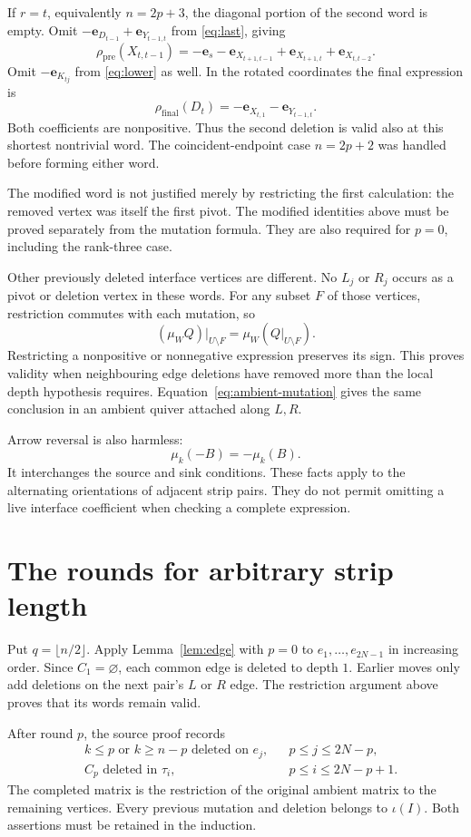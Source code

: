 \documentclass[11pt,a4paper]{article}
\newcommand{\e}{\mathbf e}
\begin{document}
If $r=t$, equivalently $n=2p+3$, the diagonal portion of the second word
is empty. Omit $-\e_{D_{t-1}}+\e_{Y_{t-1,t}}$ from \eqref{eq:last}, giving
\[
 \rho_{\mathrm{pre}}(X_{t,t-1})
 =-\e_s-\e_{X_{t+1,t-1}}+\e_{X_{t+1,t}}+\e_{X_{t,t-2}}.
\]
Omit $-\e_{K_{tj}}$ from \eqref{eq:lower} as well. In the rotated
coordinates the final expression is
\begin{equation}\label{eq:second-final}
 \rho_{\mathrm{final}}(D_t)=-\e_{X_{t,1}}-\e_{Y_{t-1,t}}.
\end{equation}
Both coefficients are nonpositive. Thus the second deletion is valid
also at this shortest nontrivial word. The coincident-endpoint case
$n=2p+2$ was handled before forming either word.

The modified word is not justified merely by restricting the first
calculation: the removed vertex was itself the first pivot. The modified
identities above must be proved separately from the mutation formula.
They are also required for $p=0$, including the rank-three case.

Other previously deleted interface vertices are different. No $L_j$ or
$R_j$ occurs as a pivot or deletion vertex in these words. For any subset
$F$ of those vertices, restriction commutes with each mutation, so
\[
 (\mu_W Q)|_{U\setminus F}=\mu_W(Q|_{U\setminus F}).
\]
Restricting a nonpositive or nonnegative expression preserves its sign.
This proves validity when neighbouring edge deletions have removed more
than the local depth hypothesis requires. Equation~\eqref{eq:ambient-mutation}
gives the same conclusion in an ambient quiver attached along $L,R$.

Arrow reversal is also harmless:
\[
 \mu_k(-B)=-\mu_k(B).
\]
It interchanges the source and sink conditions. These facts apply to the
alternating orientations of adjacent strip pairs. They do not permit
omitting a live interface coefficient when checking a complete expression.

\newpage
\section{The rounds for arbitrary strip length}
Put $q=\lfloor n/2\rfloor$. Apply Lemma~\ref{lem:edge} with $p=0$ to
$e_1,\ldots,e_{2N-1}$ in increasing order. Since $C_1=\varnothing$,
each common edge is deleted to depth $1$. Earlier moves only add
deletions on the next pair's $L$ or $R$ edge. The restriction argument
above proves that its words remain valid.

After round $p$, the source proof records
\begin{equation}\label{eq:round}
 \begin{aligned}
 &k\le p\text{ or }k\ge n-p\text{ deleted on }e_j,
       &&p\le j\le2N-p,\\
 &C_p\text{ deleted in }\tau_i,
       &&p\le i\le2N-p+1.
 \end{aligned}
\end{equation}
The completed matrix is the restriction of the original ambient matrix
to the remaining vertices. Every previous mutation and deletion belongs
to $\iota(I)$. Both assertions must be retained in the induction.
\end{document}
